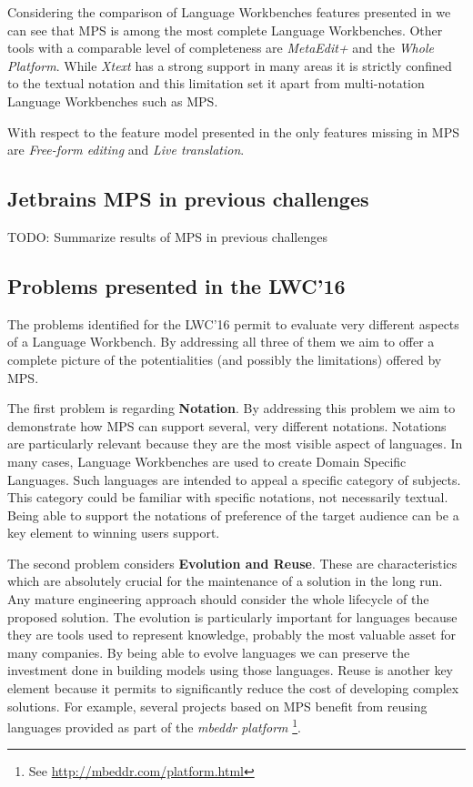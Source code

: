 \documentclass[preprint,numbers,10pt]{sigplanconf}
\begin{document}
Considering the comparison of Language Workbenches features presented in \cite{erdweg2015evaluating} we can see that MPS is among the most complete Language Workbenches. Other tools with a comparable level of completeness are \emph{MetaEdit+} and the \emph{Whole Platform}. While \emph{Xtext} \cite{Eysholdt2010} has a strong support in many areas it is strictly confined to the textual notation and this limitation set it apart from multi-notation Language Workbenches such as MPS.

With respect to the feature model presented in \cite{erdweg2015evaluating} the only features missing in MPS are \emph{Free-form editing} and \emph{Live translation}.

\subsection{Jetbrains MPS in previous challenges}

TODO: Summarize results of MPS in previous challenges

\subsection{Problems presented in the LWC'16}

The problems identified for the LWC'16 permit to evaluate very different aspects of a Language Workbench. By addressing all three of them we aim to offer a complete picture of the potentialities (and possibly the limitations) offered by MPS.

The first problem is regarding \textbf{Notation}. By addressing this problem we aim to demonstrate how MPS can support several, very different notations. Notations are particularly relevant because they are the most visible aspect of languages. In many cases, Language Workbenches are used to create Domain Specific Languages. Such languages are intended to appeal a specific category of subjects. This category could be familiar with specific notations, not necessarily textual. Being able to support the notations of preference of the target audience can be a key element to winning users support. 

The second problem considers \textbf{Evolution and Reuse}. These are characteristics which are absolutely crucial for the maintenance of a solution in the long run. Any mature engineering approach should consider the whole lifecycle of the proposed solution. The evolution is particularly important for languages because they are tools used to represent knowledge, probably the most valuable asset for many companies. By being able to evolve languages we can preserve the investment done in building models using those languages. Reuse is another key element because it permits to significantly reduce the cost of developing complex solutions. For example, several projects based on MPS benefit from reusing languages provided as part of the \emph{mbeddr platform} \footnote{See \url{http://mbeddr.com/platform.html}}.
\end{document}

